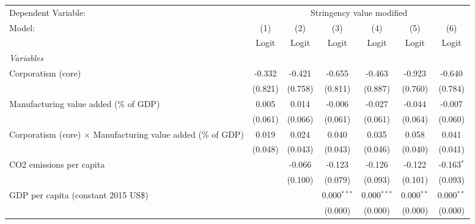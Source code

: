 
\begingroup
\centering
\begin{tabular}{lcccccc}
   \toprule
   Dependent Variable: & \multicolumn{6}{c}{Stringency value modified}\\
   Model:                                                              & (1)     & (2)     & (3)           & (4)           & (5)          & (6)\\  
                                                                       &  Logit  & Logit   & Logit         & Logit         & Logit        & Logit\\  
   \midrule
   \emph{Variables}\\
   Corporatism (core)                                                  & -0.332  & -0.421  & -0.655        & -0.463        & -0.923       & -0.640\\   
                                                                       & (0.821) & (0.758) & (0.811)       & (0.887)       & (0.760)      & (0.784)\\   
   Manufacturing value added (\% of GDP)                               & 0.005   & 0.014   & -0.006        & -0.027        & -0.044       & -0.007\\   
                                                                       & (0.061) & (0.066) & (0.061)       & (0.061)       & (0.064)      & (0.060)\\   
   Corporatism (core) $\times$ Manufacturing value added (\% of GDP)   & 0.019   & 0.024   & 0.040         & 0.035         & 0.058        & 0.041\\   
                                                                       & (0.048) & (0.043) & (0.043)       & (0.046)       & (0.040)      & (0.041)\\   
   CO2 emissions per capita                                            &         & -0.066  & -0.123        & -0.126        & -0.122       & -0.163$^{*}$\\   
                                                                       &         & (0.100) & (0.079)       & (0.093)       & (0.101)      & (0.093)\\   
   GDP per capita (constant 2015 US\$)                                 &         &         & 0.000$^{***}$ & 0.000$^{***}$ & 0.000$^{**}$ & 0.000$^{**}$\\   
                                                                       &         &         & (0.000)       & (0.000)       & (0.000)      & (0.000)\\   

\end{tabular}

